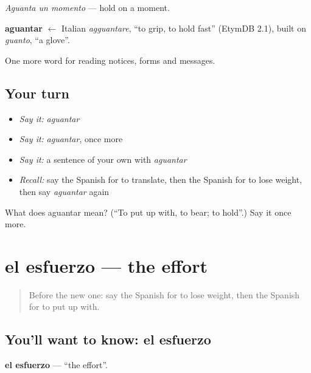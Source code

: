 \emph{Aguanta un momento} — hold on a moment.

\begin{cousinweb}
\textbf{aguantar} $\leftarrow$ Italian \emph{agguantare}, \textquotedblleft{}to grip, to hold fast\textquotedblright{} (EtymDB 2.1), built on \emph{guanto}, \textquotedblleft{}a glove\textquotedblright{}.
\end{cousinweb}

\begin{grammarlens}[title={What you've built}]
One more word for reading notices, forms and messages.
\end{grammarlens}

\subsection*{Your turn}
\begin{itemize}
\raggedright
  \item \emph{Say it:} \emph{aguantar}
  \item \emph{Say it:} \emph{aguantar}, once more
  \item \emph{Say it:} a sentence of your own with \emph{aguantar}
  \item \emph{Recall:} say the Spanish for to translate, then the Spanish for to lose weight, then say \emph{aguantar} again
\end{itemize}

\begin{tcolorbox}[breakable,colback=teal!4,colframe=teal!35!black,title={Before you move on}]
What does aguantar mean? (\textquotedblleft{}To put up with, to bear; to hold\textquotedblright{}.) Say it once more.
\end{tcolorbox}
\section[el esfuerzo]{el esfuerzo — the effort}

\label{lesson:ES-C503-esfuerzo}



\begin{quote}
Before the new one: say the Spanish for to lose weight, then the Spanish for to put up with.
\end{quote}

\subsection*{You'll want to know: el esfuerzo}
\textbf{el esfuerzo} — \textquotedblleft{}the effort\textquotedblright{}.

